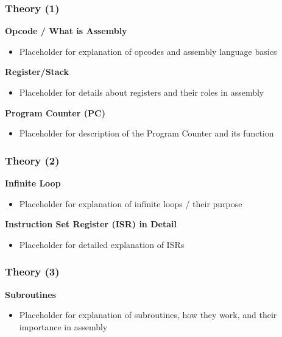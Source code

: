 \documentclass{beamer}
\begin{document}
\begin{frame}
    \frametitle{Theory (1)}
    \textbf{Opcode / What is Assembly}
    \begin{itemize}
        \item Placeholder for explanation of opcodes and assembly language basics
    \end{itemize}

    \textbf{Register/Stack}
    \begin{itemize}
        \item Placeholder for details about registers and their roles in assembly
    \end{itemize}

    \textbf{Program Counter (PC)}
    \begin{itemize}
        \item Placeholder for description of the Program Counter and its function
    \end{itemize}
\end{frame}

\begin{frame}
    \frametitle{Theory (2)}
    \textbf{Infinite Loop}
    \begin{itemize}
        \item Placeholder for explanation of infinite loops / their purpose
    \end{itemize}

    \textbf{Instruction Set Register (ISR) in Detail}
    \begin{itemize}
        \item Placeholder for detailed explanation of ISRs
    \end{itemize}
\end{frame}

\begin{frame}
    \frametitle{Theory (3)}
    \textbf{Subroutines}
    \begin{itemize}
        \item Placeholder for explanation of subroutines, how they work, and their importance in assembly
    \end{itemize}
\end{frame}
\end{document}
